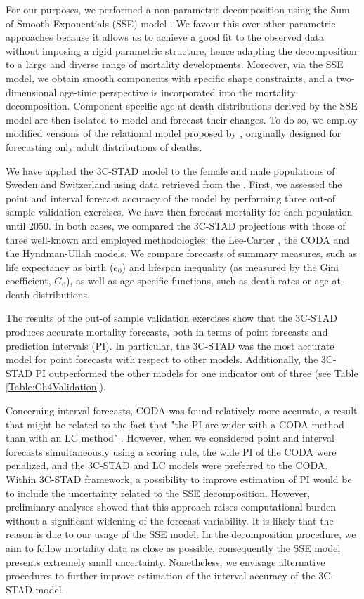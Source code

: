 \documentclass[Thesis]{subfiles}
\begin{document}
For our purposes, we performed a non-parametric decomposition using the Sum of Smooth Exponentials (SSE) model \citep{camarda2016sums}. We favour this over other parametric approaches because it allows us to achieve a good fit to the observed data without imposing a rigid parametric structure, hence adapting the decomposition to a large and diverse range of mortality developments. Moreover, via the SSE model, we obtain smooth components with specific shape constraints, and a two-dimensional age-time perspective is incorporated into the mortality decomposition. Component-specific age-at-death distributions derived by the SSE model are then isolated to model and forecast their changes. To do so, we employ modified versions of the relational model proposed by \cite{basellini2019modelling}, originally designed for forecasting only adult distributions of deaths.

We have applied the 3C-STAD model to the female and male populations of Sweden and Switzerland using data retrieved from the \cite{HMD}. First, we assessed the point and interval forecast accuracy of the model by performing three out-of sample validation exercises. We have then forecast mortality for each population until 2050. In both cases, we compared the 3C-STAD projections with those of three well-known and employed methodologies: the Lee-Carter \cite[LC,][]{lee1992modeling}, the CODA \citep{oeppen2008coherent} and the Hyndman-Ullah \cite[HU,][]{hyndman2007robust} models. We compare forecasts of summary measures, such as life expectancy as birth ($e_{0}$) and lifespan inequality (as measured by the Gini coefficient, $G_{0}$), as well as age-specific functions, such as death rates or age-at-death distributions.

The results of the out-of sample validation exercises show that the 3C-STAD produces accurate mortality forecasts, both in terms of point forecasts and prediction intervals (PI). In particular, the 3C-STAD was the most accurate model for point forecasts with respect to other models. Additionally, the 3C-STAD PI outperformed the other models for one indicator out of three (see Table \ref{Table:Ch4Validation}). 

Concerning interval forecasts, CODA was found relatively more accurate, a result that might be related to the fact that "the PI are wider with a CODA method than with an LC method" \cite[][p.~546]{bergeron2017coherent}. However, when we considered point and interval forecasts simultaneously using a scoring rule, the wide PI of the CODA were penalized, and the 3C-STAD and LC models were preferred to the CODA. Within 3C-STAD framework, a possibility to improve estimation of PI would be to include the uncertainty related to the SSE decomposition. However, preliminary analyses showed that this approach raises computational burden without a significant widening of the forecast variability. It is likely that the reason is due to our usage of the SSE model. In the decomposition procedure, we aim to follow mortality data as close as possible, consequently the SSE model presents extremely small uncertainty. Nonetheless, we envisage alternative procedures to further improve estimation of the interval accuracy of the 3C-STAD model.
\end{document}
